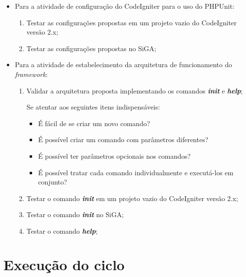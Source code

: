 	  \begin{itemize}
	  
	    \item Para a atividade de configuração do CodeIgniter para o uso do PHPUnit:
	  
		\begin{enumerate}
	      
		  \item Testar as configurações propostas em um projeto vazio do CodeIgniter versão 2.x;
		  
		  \item Testar as configurações propostas no SiGA;
		  
		\end{enumerate}
	      
	    \item Para a atividade de estabelecimento da arquitetura de funcionamento do \textit{framework}:
		
		\begin{enumerate}
	
		  \item Validar a arquitetura proposta implementando os comandos \textit{\textbf{init}} e \textit{\textbf{help}};
		      
		      \subitem Se atentar aos seguintes itens indispensáveis:
			\begin{itemize}
			  \item É fácil de se criar um novo comando?
			  \item É possível criar um comando com parâmetros diferentes?
			  \item É possível ter parâmetros opcionais nos comandos?
			  \item É possível tratar cada comando individualmente e executá-los em conjunto?
			\end{itemize}
		  
		  \item Testar o comando \textit{\textbf{init}} em um projeto vazio do CodeIgniter versão 2.x;
		  
		  \item Testar o comando \textit{\textbf{init}} no SiGA;
	
		  \item Testar o comando \textit{\textbf{help}};
		\end{enumerate}
	  
	  \end{itemize}
  
  \section{Execução do ciclo}
  
